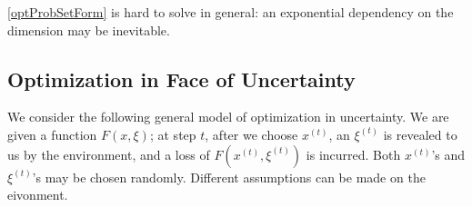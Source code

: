 \documentclass[openany]{book}
\newtheorem{theorem}{Theorem}[chapter]
\theoremstyle{definition}
\theoremstyle{remark}
\begin{document}
\eqref{optProbSetForm} is hard to solve in general: an exponential dependency on the dimension may be inevitable.
\begin{comment}
For instance, consider the following problem:
\begin{equation}\label{unitBoxMin}
    \min_{x\in[0,1]^n}f(x),
\end{equation}
where $f$ is $\lambda$-Lipschitz continuous over $[0,1]^n$. We want to find an $\epsilon$-additive approximate solution.

One can use the uniform grid method: Divide each dimension into $\lceil\frac{\lambda\sqrt{n}}{2\epsilon}\rceil$ uniform intervals, and consider all grid points. We can get an $\epsilon$-approximate solution with a query complexity of $(\lceil\frac{\lambda\sqrt{n}}{2\epsilon}\rceil+1)^n$. What's more, such a query complexity is necessary.

\begin{theorem}
    The query complexity of problem \eqref{unitBoxMin} with a zeroth order oracle is at least $(\lceil \frac{\lambda}{2\epsilon}\rceil-1)^n$.
\end{theorem}
\begin{proof}
    Divide each dimension into $\lceil \frac{\lambda}{2\epsilon}\rceil-1$ uniform intervals. For each query $x$, return $f(x)=0$. Then the algorithm will conclude the minimum is $0$. However, if the query complexity is less than $(\lceil \frac{\lambda}{2\epsilon}\rceil-1)^n$, then there will be one cube $\prod_{i=1}^n[a_i,b_i]$ whose vertices are grid points and no interior point of this cube is queried. We can then set $f(x)=\min_{1\le i\le n}\min\{\lambda(x_i-a_i),\lambda(b_i-x_i)\}$ on $\prod_{i=1}^n[a_i,b_i]$ and $0$ everywhere else. One can check that $f$ is $\lambda$-Lipschitz continuous over $[0,1]^n$ but the optimum value is $(\frac{\lambda}{2})/(\lceil \frac{\lambda}{2\epsilon}\rceil-1)>\epsilon$.
\end{proof}

In economics, and specifically monotone comparative statics, the following parameterized optimization problem is often considered:
\begin{equation}
    \min_{x\in C_t}f(x).
\end{equation}
Here $t\in T$ is a parameter. Monotone comparative statics are interested especially in cases when the optimal solution is a monotone function of $t$.
\end{comment}

\subsection{Optimization in Face of Uncertainty}
We consider the following general model of optimization in uncertainty. We are given a function $F(x,\xi)$; at step $t$, after we choose $x^{(t)}$, an $\xi^{(t)}$ is revealed to us by the environment, and a loss of $F(x^{(t)},\xi^{(t)})$ is incurred. Both $x^{(t)}$'s and $\xi^{(t)}$'s may be chosen randomly. Different assumptions can be made on the eivonment.
\end{document}
